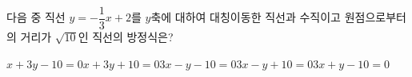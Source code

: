 다음 중 직선 $y=-\dfrac{1}{3}x+2$를 $y$축에 대하여 대칭이동한 직선과 수직이고 원점으로부터의 거리가 $\sqrt{10}$인 직선의 방정식은?
\begin{choicesii}{$x+3y-10=0$}{$x+3y+10=0$}{$3x-y-10=0$}{$3x-y+10=0$}{$3x+y-10=0$}\end{choicesii}
